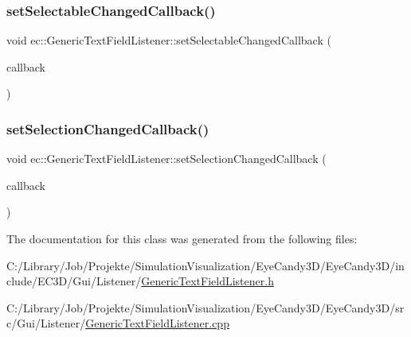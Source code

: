 \subsubsection{\texorpdfstring{set\+Selectable\+Changed\+Callback()}{setSelectableChangedCallback()}}
{\footnotesize\ttfamily void ec\+::\+Generic\+Text\+Field\+Listener\+::set\+Selectable\+Changed\+Callback (\begin{DoxyParamCaption}\item[{const \mbox{\hyperlink{classec_1_1_generic_text_field_listener_afa761f962b7fb681d7d9d29a132f800e}{Selectable\+Changed\+\_\+\+Callback}} \&}]{callback }\end{DoxyParamCaption})}

\mbox{\label{classec_1_1_generic_text_field_listener_aea5a7265627003b41e3a74744a1251d6}} 
\subsubsection{\texorpdfstring{set\+Selection\+Changed\+Callback()}{setSelectionChangedCallback()}}
{\footnotesize\ttfamily void ec\+::\+Generic\+Text\+Field\+Listener\+::set\+Selection\+Changed\+Callback (\begin{DoxyParamCaption}\item[{const \mbox{\hyperlink{classec_1_1_generic_text_field_listener_aa25985c5297422833dc4f5395562f238}{Selection\+Changed\+\_\+\+Callback}} \&}]{callback }\end{DoxyParamCaption})}



The documentation for this class was generated from the following files\+:\begin{DoxyCompactItemize}
\item 
C\+:/\+Library/\+Job/\+Projekte/\+Simulation\+Visualization/\+Eye\+Candy3\+D/\+Eye\+Candy3\+D/include/\+E\+C3\+D/\+Gui/\+Listener/\mbox{\hyperlink{_generic_text_field_listener_8h}{Generic\+Text\+Field\+Listener.\+h}}\item 
C\+:/\+Library/\+Job/\+Projekte/\+Simulation\+Visualization/\+Eye\+Candy3\+D/\+Eye\+Candy3\+D/src/\+Gui/\+Listener/\mbox{\hyperlink{_generic_text_field_listener_8cpp}{Generic\+Text\+Field\+Listener.\+cpp}}\end{DoxyCompactItemize}
